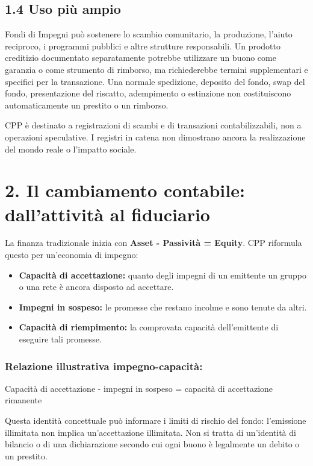 \documentclass[11pt]{article}
\begin{document}
\subsection*{1.4 Uso più ampio}

Fondi di Impegni può sostenere lo scambio comunitario, la produzione, l'aiuto reciproco, i programmi pubblici e altre strutture responsabili. Un prodotto creditizio documentato separatamente potrebbe utilizzare un buono come garanzia o come strumento di rimborso, ma richiederebbe termini supplementari e specifici per la transazione. Una normale spedizione, deposito del fondo, swap del fondo, presentazione del riscatto, adempimento o estinzione non costituiscono automaticamente un prestito o un rimborso.

CPP è destinato a registrazioni di scambi e di transazioni contabilizzabili, non a operazioni speculative. I registri in catena non dimostrano ancora la realizzazione del mondo reale o l'impatto sociale.


\section*{2. Il cambiamento contabile: dall'attività al fiduciario}

La finanza tradizionale inizia con \textbf{Asset - Passività = Equity}. CPP riformula questo per un'economia di impegno:

\begin{itemize}[leftmargin=*]
\item \textbf{Capacità di accettazione:} quanto degli impegni di un emittente un gruppo o una rete è ancora disposto ad accettare.
\item \textbf{Impegni in sospeso:} le promesse che restano incolme e sono tenute da altri.
\item \textbf{Capacità di riempimento:} la comprovata capacità dell'emittente di eseguire tali promesse.
\end{itemize}
\subsubsection*{Relazione illustrativa impegno-capacità:}

Capacità di accettazione - impegni in sospeso = capacità di accettazione rimanente

Questa identità concettuale può informare i limiti di rischio del fondo: l'emissione illimitata non implica un'accettazione illimitata. Non si tratta di un'identità di bilancio o di una dichiarazione secondo cui ogni buono è legalmente un debito o un prestito.
\end{document}
